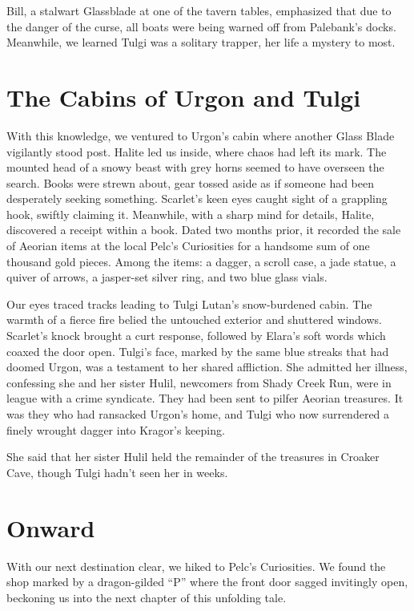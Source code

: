 \documentclass[
  12pt,twoside,twocolumn,openany,nodeprecatedcode]{dndbook}
\begin{document}
Bill, a stalwart Glassblade at one of the tavern tables, emphasized that
due to the danger of the curse, all boats were being warned off from
Palebank's docks. Meanwhile, we learned Tulgi was a solitary trapper,
her life a mystery to most.

\section{The Cabins of Urgon and
Tulgi}\label{the-cabins-of-urgon-and-tulgi}

With this knowledge, we ventured to Urgon's cabin where another Glass
Blade vigilantly stood post. Halite led us inside, where chaos had left
its mark. The mounted head of a snowy beast with grey horns seemed to
have overseen the search. Books were strewn about, gear tossed aside as
if someone had been desperately seeking something. Scarlet's keen eyes
caught sight of a grappling hook, swiftly claiming it. Meanwhile, with a
sharp mind for details, Halite, discovered a receipt within a book.
Dated two months prior, it recorded the sale of Aeorian items at the
local Pelc's Curiosities for a handsome sum of one thousand gold pieces.
Among the items: a dagger, a scroll case, a jade statue, a quiver of
arrows, a jasper-set silver ring, and two blue glass vials.

Our eyes traced tracks leading to Tulgi Lutan's snow-burdened cabin. The
warmth of a fierce fire belied the untouched exterior and shuttered
windows. Scarlet's knock brought a curt response, followed by Elara's
soft words which coaxed the door open. Tulgi's face, marked by the same
blue streaks that had doomed Urgon, was a testament to her shared
affliction. She admitted her illness, confessing she and her sister
Hulil, newcomers from Shady Creek Run, were in league with a crime
syndicate. They had been sent to pilfer Aeorian treasures. It was they
who had ransacked Urgon's home, and Tulgi who now surrendered a finely
wrought dagger into Kragor's keeping.

She said that her sister Hulil held the remainder of the treasures in
Croaker Cave, though Tulgi hadn't seen her in weeks.

\section{Onward}\label{onward}

With our next destination clear, we hiked to Pelc's Curiosities. We
found the shop marked by a dragon-gilded ``P'' where the front door
sagged invitingly open, beckoning us into the next chapter of this
unfolding tale.
\end{document}
